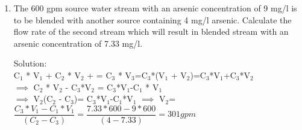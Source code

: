 \documentclass{article}
\begin{document}
\begin{enumerate}
 \vspace{0.3cm}
 \item The 600 gpm source water stream with an arsenic concentration of 9 mg/l is to be blended with another source containing 4 mg/l arsenic.  Calculate the flow rate of the second stream which will result in blended stream with an arsenic concentration of 7.33 mg/l.

Solution:\\
\vspace{0.2cm}
C$_1$ * V$_1$ + C$_2$ * V$_2$ + =  C$_3$ * V$_3$=C$_3$*(V$_1$ + V$_2$)=C$_3$*V$_1$+C$_3$*V$_2$\\
\vspace{0.3cm}
$\implies$ C$_2$ * V$_2$ - C$_3$*V$_2$ = C$_3$*V$_1$-C$_1$ * V$_1$ \\
\vspace{0.3cm}
$\implies$ V$_2$(C$_2$ - C$_3$)= C$_3$*V$_1$-C$_1$*V$_1$
\vspace{0.3cm}
$\implies$ V$_2$= $\dfrac{C_3*V_1-C_1 * V_1}{(C_2 - C_3)}=\dfrac{7.33*600-9 * 600}{(4 - 7.33)}=\boxed{301 gpm}$

\end{enumerate}
\end{document}
